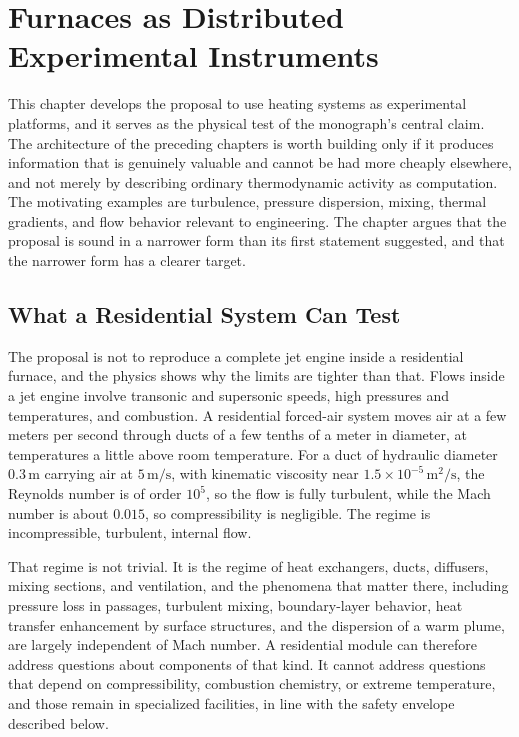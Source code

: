 \chapter{Furnaces as Distributed Experimental Instruments}
\label{ch:furnaces}

This chapter develops the proposal to use heating systems as experimental platforms, and it serves as the physical test of the monograph's central claim. The architecture of the preceding chapters is worth building only if it produces information that is genuinely valuable and cannot be had more cheaply elsewhere, and not merely by describing ordinary thermodynamic activity as computation. The motivating examples are turbulence, pressure dispersion, mixing, thermal gradients, and flow behavior relevant to engineering. The chapter argues that the proposal is sound in a narrower form than its first statement suggested, and that the narrower form has a clearer target.

\section{What a Residential System Can Test}

The proposal is not to reproduce a complete jet engine inside a residential furnace, and the physics shows why the limits are tighter than that. Flows inside a jet engine involve transonic and supersonic speeds, high pressures and temperatures, and combustion. A residential forced-air system moves air at a few meters per second through ducts of a few tenths of a meter in diameter, at temperatures a little above room temperature. For a duct of hydraulic diameter $0.3\,\mathrm{m}$ carrying air at $5\,\mathrm{m/s}$, with kinematic viscosity near $1.5\times10^{-5}\,\mathrm{m^2/s}$, the Reynolds number is of order $10^{5}$, so the flow is fully turbulent, while the Mach number is about $0.015$, so compressibility is negligible. The regime is incompressible, turbulent, internal flow.

That regime is not trivial. It is the regime of heat exchangers, ducts, diffusers, mixing sections, and ventilation, and the phenomena that matter there, including pressure loss in passages, turbulent mixing, boundary-layer behavior, heat transfer enhancement by surface structures, and the dispersion of a warm plume, are largely independent of Mach number. A residential module can therefore address questions about components of that kind. It cannot address questions that depend on compressibility, combustion chemistry, or extreme temperature, and those remain in specialized facilities, in line with the safety envelope described below.

